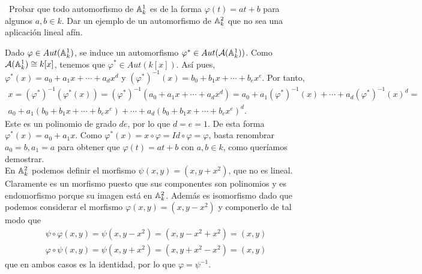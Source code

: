 \documentclass[twoside]{article}
\begin{document}
\begin{ejercicio}{5}\
Probar que todo automorfismo de $\mathbb{A}^1_k$ es de la forma $\varphi(t) = at+b$
para algunos $a, b \in k$. Dar un ejemplo de un automorfismo de $\mathbb{A}^2_k$ que no sea
una aplicación lineal afín.
\end{ejercicio}
\begin{solucion}
Dado $\varphi\in Aut(\mathbb{A}^1_k)$, se induce un automorfismo $\varphi^*\in Aut(\mathcal{A}(\mathbb{A}^1_k))$. Como $\mathcal{A}(\mathbb{A}^1_k)\cong k[x]$, tenemos que $\varphi^*\in Aut(k[x])$. Así pues, $\varphi^*(x)=a_0+a_1x+\cdots+a_dx^d$  y $(\varphi^*)^{-1}(x)=b_0+b_1x+\cdots+b_ex^e$. Por tanto,
\begin{gather*}
x=(\varphi^*)^{-1}(\varphi^*(x))=(\varphi^*)^{-1}(a_0+a_1x+\cdots+a_dx^d)=a_0+a_1(\varphi^*)^{-1}(x)+\cdots+a_d(\varphi^*)^{-1}(x)^d=\\
a_0+a_1(b_0+b_1x+\cdots+b_ex^e)+\cdots+a_d(b_0+b_1x+\cdots+b_ex^e)^d.
\end{gather*}
Este es un polinomio de grado $de$, por lo que $d=e=1$. De esta forma $\varphi^*(x)=a_0+a_1x$. Como $\varphi^*(x)=x\circ \varphi=Id\circ\varphi=\varphi$, basta renombrar $a_0=b, a_1=a$ para obtener que $\varphi(t)=at+b$ con $a,b\in k$, como queríamos demostrar.\\

En $\mathbb{A}^2_k$ podemos definir el morfismo $\psi(x,y)=(x,y+x^2)$, que no es lineal. Claramente es un morfismo puesto que sus componentes son polinomios y es endomorfismo porque su imagen está en $\mathbb{A}^2_k$. Además es isomorfismo dado que podemos considerar el morfismo $\varphi(x,y)=(x,y-x^2)$ y componerlo de tal modo que
\begin{align*}
\psi\circ\varphi(x,y)=\psi(x,y-x^2)=(x,y-x^2+x^2)=(x,y)\\
\varphi\circ\psi(x,y)=\psi(x,y+x^2)=(x,y+x^2-x^2)=(x,y)
\end{align*}
que en ambos casos es la identidad, por lo que $\varphi=\psi^{-1}$. 


\end{solucion}
\end{document}
